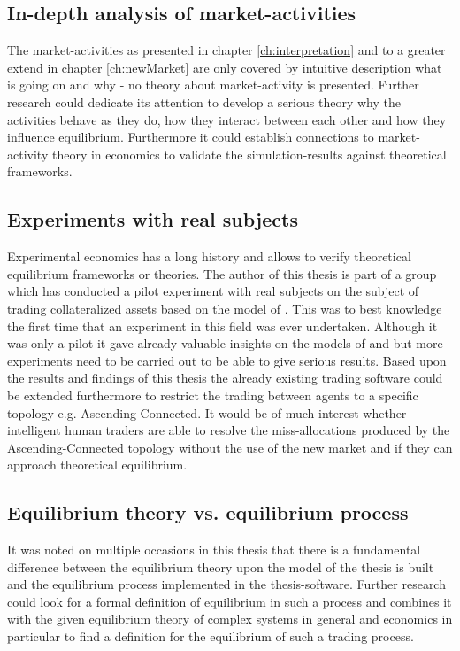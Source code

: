 \documentclass[Bachelorarbeit.tex]{subfiles}
\begin{document}
\subsection*{In-depth analysis of market-activities}
The market-activities as presented in chapter \ref{ch:interpretation} and to a greater extend in chapter \ref{ch:newMarket} are only covered by intuitive description what is going on and why - no theory about market-activity is presented. Further research could dedicate its attention to develop a serious theory why the activities behave as they do, how they interact between each other and how they influence equilibrium. Furthermore it could establish connections to market-activity theory in economics to validate the simulation-results against theoretical frameworks.

\subsection*{Experiments with real subjects}
Experimental economics has a long history and allows to verify theoretical equilibrium frameworks or theories. The author of this thesis is part of a group which has conducted a pilot experiment with real subjects on the subject of trading collateralized assets based on the model of \cite{Breuer2015}. This was to best knowledge the first time that an experiment in this field was ever undertaken. Although it was only a pilot it gave already valuable insights on the models of \cite{Breuer2015} and \cite{Geanakoplos2009} but more experiments need to be carried out to be able to give serious results. Based upon the results and findings of this thesis the already existing trading software could be extended furthermore to restrict the trading between agents to a specific topology e.g. Ascending-Connected. It would be of much interest whether intelligent human traders are able to resolve the miss-allocations produced by the Ascending-Connected topology without the use of the new market and if they can approach theoretical equilibrium.

\subsection*{Equilibrium theory vs. equilibrium process}
It was noted on multiple occasions in this thesis that there is a fundamental difference between the equilibrium theory upon the model of the thesis is built and the equilibrium process implemented in the thesis-software. Further research could look for a formal definition of equilibrium in such a process and combines it with the given equilibrium theory of complex systems in general and economics in particular to find a definition for the equilibrium of such a trading process.
\end{document}

